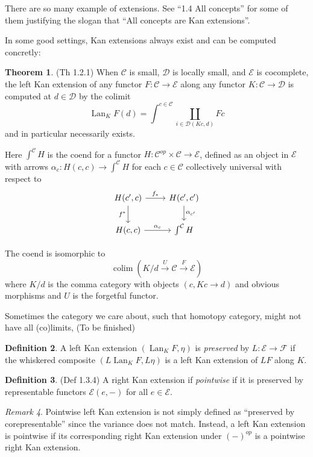 \documentclass[11pt]{article}
\theoremstyle{definition}
\newtheorem{theorem}{Theorem}[part]
\newtheorem{definition}[theorem]{Definition}
\theoremstyle{remark}
\newtheorem{remark}[theorem]{Remark}
\newcommand{\Lan}{\operatorname{Lan}}
\newcommand{\colim}{\operatorname{colim}}
\newcommand{\calC}{\mathcal{C}}
\newcommand{\calD}{\mathcal{D}}
\newcommand{\calE}{\mathcal{E}}
\newcommand{\calF}{\mathcal{F}}
\begin{document}
There are so many example of extensions. See ``1.4 All concepts'' for some of them justifying the
slogan that ``All concepts are Kan extensions''.

In some good settings, Kan extensions always exist and can be computed concretly:
\begin{theorem}(Th 1.2.1)
    When $\calC$ is small, $\calD$ is locally small, and $\calE$ is cocomplete,
    the left Kan extension of any functor $F : \calC \to \calE$ along any functor
    $K : \calC \to \calD$ is computed at $d \in \calD$ by the colimit
    \[\Lan_K F(d)= \int^{c \in \mathcal{C}} \coprod_{i \in \mathcal{D}(Kc,d)} Fc\]
    and in particular necessarily exists.
\end{theorem}

Here $\int^{\calC}H$ is the coend for a functor $H : \calC^{op} \times \calC \to \calE$,
defined as an object in $\calE$ with arrows $\alpha_c : H(c,c) \to \int^{\calC}H$ for each $c \in \calC$
collectively universal with respect to
\[
\begin{tikzcd}
    H(c',c) \arrow[r, "f_*"] \arrow[d,"f^*"'] & H(c',c') \arrow[d, "\alpha_{c'}"] \\
    H(c,c) \arrow[r, "\alpha_c"] & \int^{\calC} H
\end{tikzcd}
\]

The coend is isomorphic to $$\colim(K/d \stackrel{U}{\to} \calC \stackrel{F}{\to} \calE)$$
where $K/d$ is the comma category with objects $(c, Kc \to d)$ and obvious morphisms
and $U$ is the forgetful functor.

Sometimes the category we care about, such that homotopy category, might not have all (co)limits,
(To be finished)

\begin{definition}
    A left Kan extension $(\Lan_K F, \eta)$ is \emph{preserved} by $L : \calE \to \calF$ if the
    whiskered composite $(L\Lan_K F, L \eta)$ is a left Kan extension of $LF$ along $K$.
\end{definition}

\begin{definition}(Def 1.3.4)
    A right Kan extension if \emph{pointwise} if it is preserved by representable functors $\calE(e,-)$ for all $e \in \calE$.
\end{definition}

\begin{remark}
    Pointwise left Kan extension is not simply defined as ``preserved by corepresentable'' since the variance does not match.
    Instead, a left Kan extension is pointwise if its corresponding right Kan extension
    under $(-)^{op}$ is a pointwise right Kan extension.
\end{remark}
\end{document}
